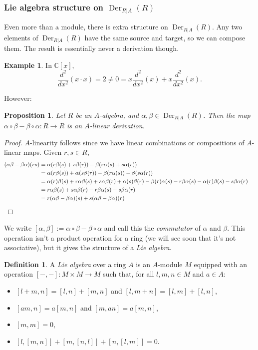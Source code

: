\documentclass{amsart}[12pt]
\def\Der{\operatorname{Der}}
\newcommand{\C}{\mathbb{C}}
\numberwithin{equation}{section}
\theoremstyle{plain} %
\newtheorem{prop}[equation]{Proposition}
\theoremstyle{definition}
\newtheorem{defn}[equation]{Definition}
\newtheorem{ex}[equation]{Example}
\theoremstyle{remark}
\newcommand{\sssec}[1]{\subsubsection{#1}}
\begin{document}
\sssec{Lie algebra structure on $\Der_{R|A}(R)$}

Even more than a module, there is extra structure on $\Der_{R|A}(R)$. Any two elements of $\Der_{R|A}(R)$ have the same source and target, so we can compose them. The result is essentially never a derivation though.

\begin{ex} In $\C[x]$, 
\[ \frac{d^2}{dx^2}(x\cdot x) = 2 \neq 0 = x \frac{d^2}{dx^2}(x) + x \frac{d^2}{dx^2}(x).\]
\end{ex}

However:

\begin{prop} Let $R$ be an $A$-algebra, and $\alpha,\beta\in \Der_{R|A}(R)$. Then the map $\alpha\circ \beta - \beta\circ \alpha:R\to R$ is an $A$-linear derivation.
\end{prop}
\begin{proof} $A$-linearity follows since we have linear combinations or compositions of $A$-linear maps. Given $r,s\in R$,
\[\begin{aligned} (\alpha\beta - \beta \alpha)(rs) &= \alpha(r \beta(s) + s\beta(r)) - \beta(r \alpha(s) + s \alpha(r))\\
&= \alpha(r \beta(s)) +\alpha( s\beta(r)) - \beta(r \alpha(s)) -\beta( s \alpha(r)) \\
&= \alpha(r) \beta(s) + r \alpha \beta(s) + s \alpha\beta(r)  + \alpha(s)\beta(r) - \beta(r) \alpha(s) - r \beta\alpha(s) - \alpha(r)\beta(s) - s \beta\alpha(r)\\
&=  r \alpha \beta(s) + s \alpha\beta(r)   - r \beta\alpha(s) - s \beta\alpha(r) \\
&= r (\alpha\beta - \beta \alpha)(s) + s (\alpha\beta - \beta \alpha)(r)  \hspace{3.2in}  \qedhere
\end{aligned}\]
\end{proof}

We write $[\alpha,\beta]:= \alpha\circ \beta - \beta\circ \alpha$ and call this the \emph{commutator} of $\alpha$ and $\beta$.\index{$[\alpha,\beta]$} This operation isn't a product operation for a ring (we will see soon that it's not associative), but it gives the structure of a \emph{Lie algebra}.

\begin{defn} A \emph{Lie algebra} over a ring $A$ is an $A$-module $M$ equipped with an operation $[ - , - ]: M\times M \to M$ such that, for all $l,m,n\in M$ and $a\in A$:
\begin{itemize}
\item $[l+m,n] = [l,n]+[m,n]$ and $[l,m+n] = [l,m]+[l,n]$,
\item $[am,n] = a[m,n]$ and $[m,an] = a[m,n]$,
\item $[m,m] =0$,
\item $[l,[m,n]] + [m,[n,l]] + [n,[l,m]] =0$.
\end{itemize}
\end{defn}
\end{document}
